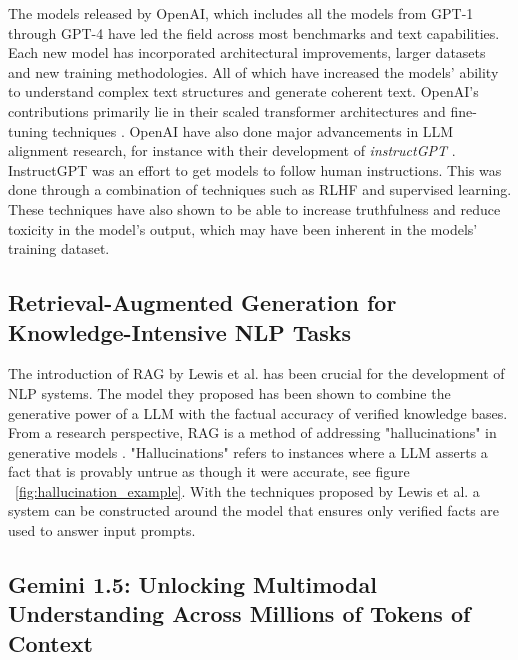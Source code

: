The models released by OpenAI, which includes all the models from GPT-1 through GPT-4 have led the field across most benchmarks and text capabilities. Each new model has incorporated architectural improvements, larger datasets and new training methodologies. All of which have increased the models’ ability to understand complex text structures and generate coherent text. OpenAI’s contributions primarily lie in their scaled transformer architectures and fine-tuning techniques \cite{brown_language_2020}. OpenAI have also done major advancements in \gls{LLM} alignment research, for instance with their development of \textit{instructGPT} \cite{ouyang_training_2022}. InstructGPT was an effort to get models to follow human instructions. This was done through a combination of techniques such as \gls{RLHF} and supervised learning. These techniques have also shown to be able to increase truthfulness and reduce toxicity in the model’s output, which may have been inherent in the models’ training dataset.


\subsection{Retrieval-Augmented Generation for Knowledge-Intensive NLP Tasks}
\label{sec:related_works_rag}


The introduction of \gls{RAG} by Lewis et al. has been crucial for the development of \gls{NLP} systems. The model they proposed has been shown to combine the generative power of a \gls{LLM} with the factual accuracy of verified knowledge bases. From a research perspective, \gls{RAG} is a method of addressing "hallucinations" in generative models \cite{lewis_retrieval-augmented_2021}. "Hallucinations" refers to instances where a \gls{LLM} asserts a fact that is provably untrue as though it were accurate, see figure ~\ref{fig:hallucination_example}. With the techniques proposed by Lewis et al. a system can be constructed around the model that ensures only verified facts are used to answer input prompts.


\subsection{Gemini 1.5: Unlocking Multimodal Understanding Across Millions of Tokens of Context}


